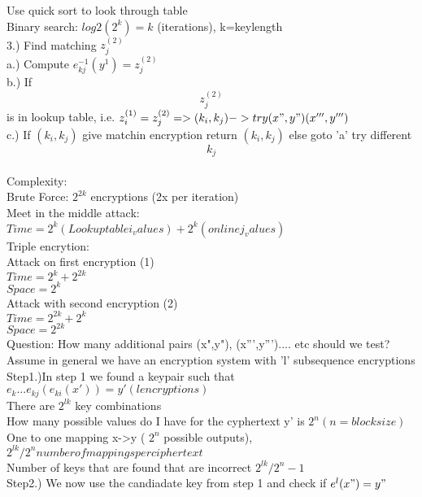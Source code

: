 \documentclass[12pt,letterpaper]{article}
\begin{document}
Use quick sort to look through table\\
Binary search: \(log2(2^k)=k \) (iterations), k=keylength\\


3.) Find matching \(z_{j}^{(2)}\)\\
a.) Compute \(e_{kj}^{-1}(y^1)=z_{j}^{(2)}\)\\
b.) If \[z_{j}^{(2)}\] is in lookup table, i.e. \(z_{i}^{(1)}=z_{j}^{(2)} => (k_{i},k_{j}) -> try (x",y")(x''',y''')\)\\
c.) If \((k_{i},k_{j})\) give matchin encryption return \((k_{i},k_{j})\) else goto 'a' try different \[k_{j}\]\\


Complexity:\\
Brute Force: \(2^{2k}\) encryptions (2x per iteration)\\
Meet in the middle attack: \(Time = 2^k(Lookup table i_values) + 2^k (online j_values)\)\\


Triple encrytion:\\
Attack on first encryption (1)\\
\(Time = 2^k+2^{2k}\)\\
\(Space = 2^k\)\\
Attack with second encryption (2)\\
\(Time = 2^{2k}+2^{k}\)\\
\(Space = 2^{2k}\)\\


Question: How many additional pairs (x",y"), (x''',y''').... etc should we test?\\

Assume in general we have an encryption system with 'l' subsequence encryptions\\

Step1.)In step 1 we found a keypair such that \(e_{k}...e_{kj}(e_{ki}(x'))=y' (l encryptions) \)\\
There are \(2^{lk}\) key combinations\\

How many possible values do I have for the cyphertext y' is \(2^n (n=blocksize)\)\\
One to one mapping x->y ( \(2^n\) possible outputs), \(2^{lk}/2^n number of mappings per ciphertext \)\\
Number of keys that are found that are incorrect \(2^{lk}/2^n-1\)\\

Step2.)  We now use the candiadate key from step 1 and check if \(e^l(x")=y"\)\\
\end{document}
